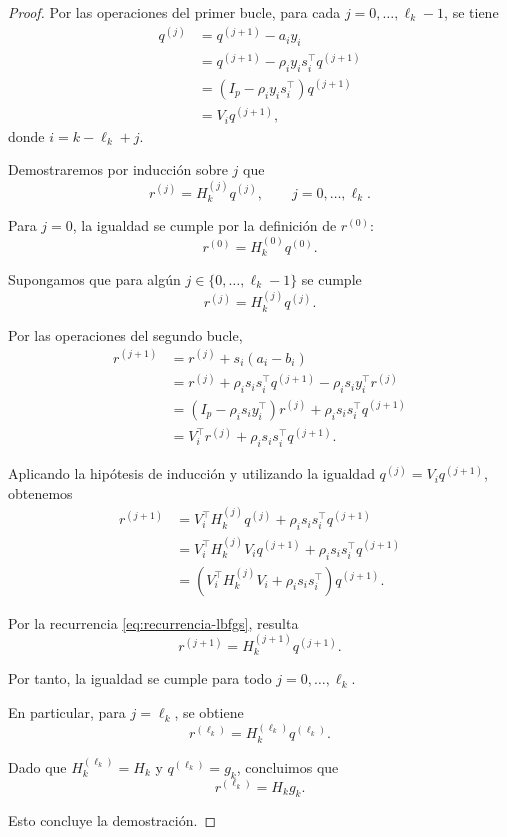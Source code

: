 \documentclass[a4paper,openany,oneside,10pt]{report}
\theoremstyle{pnlTeorema}
\theoremstyle{pnlDefinicion}
\theoremstyle{pnlObservacion}
\begin{document}
\begin{proof}

Por las operaciones del primer bucle, para cada
$j=0,\ldots,\ell_k-1$, se tiene
\begin{align*}
    q^{(j)}
    &=q^{(j+1)}-a_i y_i\\
    &=q^{(j+1)}-\rho_i y_i s_i^\top q^{(j+1)}\\
    &=(I_p-\rho_i y_i s_i^\top)q^{(j+1)}\\
    &=V_i q^{(j+1)},
\end{align*}
donde $i=k-\ell_k+j$.

Demostraremos por inducción sobre $j$ que
\[
    r^{(j)}=H_k^{(j)}q^{(j)},
    \qquad j=0,\ldots,\ell_k.
\]

Para $j=0$, la igualdad se cumple por la definición
de $r^{(0)}$:
\[
    r^{(0)}=H_k^{(0)}q^{(0)}.
\]

Supongamos que para algún
$j\in\{0,\ldots,\ell_k-1\}$ se cumple
\[
    r^{(j)}=H_k^{(j)}q^{(j)}.
\]

Por las operaciones del segundo bucle,
\begin{align*}
    r^{(j+1)}
    &=r^{(j)}+s_i(a_i-b_i)\\
    &=r^{(j)}+\rho_i s_i s_i^\top q^{(j+1)}
    -\rho_i s_i y_i^\top r^{(j)}\\
    &=(I_p-\rho_i s_i y_i^\top)r^{(j)}
    +\rho_i s_i s_i^\top q^{(j+1)}\\
    &=V_i^\top r^{(j)}
    +\rho_i s_i s_i^\top q^{(j+1)}.
\end{align*}

Aplicando la hipótesis de inducción y utilizando la
igualdad $q^{(j)}=V_i q^{(j+1)}$, obtenemos
\begin{align*}
    r^{(j+1)}
    &=V_i^\top H_k^{(j)}q^{(j)}
    +\rho_i s_i s_i^\top q^{(j+1)}\\
    &=V_i^\top H_k^{(j)}V_i q^{(j+1)}
    +\rho_i s_i s_i^\top q^{(j+1)}\\
    &=\left(
        V_i^\top H_k^{(j)}V_i
        +\rho_i s_i s_i^\top
    \right)q^{(j+1)}.
\end{align*}

Por la recurrencia \eqref{eq:recurrencia-lbfgs}, resulta
\[
    r^{(j+1)}=H_k^{(j+1)}q^{(j+1)}.
\]

Por tanto, la igualdad se cumple para todo
$j=0,\ldots,\ell_k$.

En particular, para $j=\ell_k$, se obtiene
\[
    r^{(\ell_k)}=H_k^{(\ell_k)}q^{(\ell_k)}.
\]

Dado que $H_k^{(\ell_k)}=H_k$ y
$q^{(\ell_k)}=g_k$, concluimos que
\[
    \boxed{r^{(\ell_k)}=H_k g_k.}
\]

Esto concluye la demostración.
\end{proof}
\end{document}
